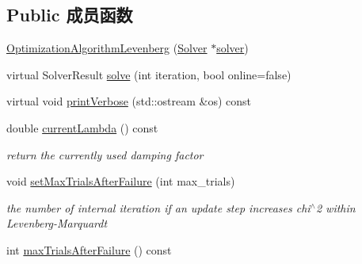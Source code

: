 \subsection*{Public 成员函数}
\begin{DoxyCompactItemize}
\item 
\hyperlink{classg2o_1_1OptimizationAlgorithmLevenberg_aecdac695d6406eb2234bbd8a0c4d53a3}{Optimization\-Algorithm\-Levenberg} (\hyperlink{classg2o_1_1Solver}{Solver} $\ast$\hyperlink{classg2o_1_1OptimizationAlgorithmWithHessian_a85473a4073c76b1a52cf9cf175e31c45}{solver})
\item 
virtual Solver\-Result \hyperlink{classg2o_1_1OptimizationAlgorithmLevenberg_a7140fa989b54eac4e09ba17829dcada0}{solve} (int iteration, bool online=false)
\item 
virtual void \hyperlink{classg2o_1_1OptimizationAlgorithmLevenberg_aed32286a2e441240f34dd5d1dbcd6d56}{print\-Verbose} (std\-::ostream \&os) const 
\item 
\hypertarget{classg2o_1_1OptimizationAlgorithmLevenberg_aa1b7ffe63dbeae410128c5cc6c95a7ab}{double \hyperlink{classg2o_1_1OptimizationAlgorithmLevenberg_aa1b7ffe63dbeae410128c5cc6c95a7ab}{current\-Lambda} () const }\label{classg2o_1_1OptimizationAlgorithmLevenberg_aa1b7ffe63dbeae410128c5cc6c95a7ab}

\begin{DoxyCompactList}\small\item\em return the currently used damping factor \end{DoxyCompactList}\item 
\hypertarget{classg2o_1_1OptimizationAlgorithmLevenberg_a0fd2212e456428e44ddac693f6d27ac8}{void \hyperlink{classg2o_1_1OptimizationAlgorithmLevenberg_a0fd2212e456428e44ddac693f6d27ac8}{set\-Max\-Trials\-After\-Failure} (int max\-\_\-trials)}\label{classg2o_1_1OptimizationAlgorithmLevenberg_a0fd2212e456428e44ddac693f6d27ac8}

\begin{DoxyCompactList}\small\item\em the number of internal iteration if an update step increases chi$^\wedge$2 within Levenberg-\/\-Marquardt \end{DoxyCompactList}\item 
\hypertarget{classg2o_1_1OptimizationAlgorithmLevenberg_a76d1c53e6a7e9061c1a8f59f96726e82}{int \hyperlink{classg2o_1_1OptimizationAlgorithmLevenberg_a76d1c53e6a7e9061c1a8f59f96726e82}{max\-Trials\-After\-Failure} () const }\label{classg2o_1_1OptimizationAlgorithmLevenberg_a76d1c53e6a7e9061c1a8f59f96726e82}


\end{DoxyCompactItemize}
